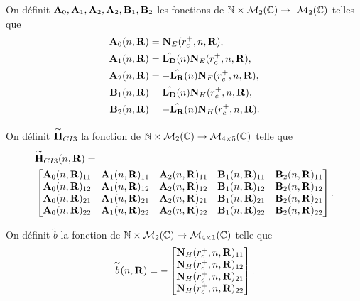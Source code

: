     \begin{defn}
      On définit \(\mathbf{A}_0,\mathbf{A}_1,\mathbf{A}_2,\mathbf{A}_2,\mathbf{B}_1,\mathbf{B}_2\) les fonctions de \(\mathbb N \times \mathcal{M}_2(\mathbb C) \rightarrow \ \mathcal{M}_2(\mathbb C)\) telles que        
      \begin{align*}
        \mathbf{A}_0(n,\mathbf{R}) &= \mathbf{N}_E(r_c^+,n,\mathbf{R}),
        \\
        \mathbf{A}_1(n,\mathbf{R}) &= \hat{\mathbf{L_D}}(n)\mathbf{N}_E(r_c^+,n,\mathbf{R}),
        \\
        \mathbf{A}_2(n,\mathbf{R}) &= -\hat{\mathbf{L_R}}(n)\mathbf{N}_E(r_c^+,n,\mathbf{R}),
        \\
        \mathbf{B}_1(n,\mathbf{R}) &= \hat{\mathbf{L_D}}(n)\mathbf{N}_H(r_c^+,n,\mathbf{R}),
        \\
        \mathbf{B}_2(n,\mathbf{R}) &= -\hat{\mathbf{L_R}}(n)\mathbf{N}_H(r_c^+,n,\mathbf{R}).
      \end{align*}

      On définit \(\overset{\thicksim}{\mathbf{H}}_{CI3}\) la fonction de \(\mathbb N \times \mathcal{M}_2(\mathbb C) \rightarrow \mathcal{M}_{4\times5}(\mathbb C)\) telle que
      \begin{align*}
        & \overset{\thicksim}{\mathbf{H}}_{CI3}(n,\mathbf{R}) =  \\ &
        \begin{bmatrix}
          \mathbf{A}_0(n,\mathbf{R})_{11} & \mathbf{A}_1(n,\mathbf{R})_{11} & \mathbf{A}_2(n,\mathbf{R})_{11} & \mathbf{B}_1(n,\mathbf{R})_{11} & \mathbf{B}_2(n,\mathbf{R})_{11}
          \\
          \mathbf{A}_0(n,\mathbf{R})_{12} & \mathbf{A}_1(n,\mathbf{R})_{12} & \mathbf{A}_2(n,\mathbf{R})_{12} & \mathbf{B}_1(n,\mathbf{R})_{12} & \mathbf{B}_2(n,\mathbf{R})_{12}
          \\
          \mathbf{A}_0(n,\mathbf{R})_{21} & \mathbf{A}_1(n,\mathbf{R})_{21} & \mathbf{A}_2(n,\mathbf{R})_{21} & \mathbf{B}_1(n,\mathbf{R})_{21} & \mathbf{B}_2(n,\mathbf{R})_{21}
          \\
          \mathbf{A}_0(n,\mathbf{R})_{22} & \mathbf{A}_1(n,\mathbf{R})_{22} & \mathbf{A}_2(n,\mathbf{R})_{22} & \mathbf{B}_1(n,\mathbf{R})_{22} & \mathbf{B}_2(n,\mathbf{R})_{22}
        \end{bmatrix}.
      \end{align*}

      On définit \(\tilde{b}\) la fonction de \(\mathbb N \times \mathcal{M}_2(\mathbb C) \rightarrow \mathcal{M}_{4\times1}(\mathbb C)\) telle que
      \begin{equation*}
        \overset{\thicksim}{b}(n,\mathbf{R}) = -
        \begin{bmatrix}
          \mathbf{N}_H(r_c^+,n,\mathbf{R})_{11}
          \\
          \mathbf{N}_H(r_c^+,n,\mathbf{R})_{12}
          \\
          \mathbf{N}_H(r_c^+,n,\mathbf{R})_{21}
          \\
          \mathbf{N}_H(r_c^+,n,\mathbf{R})_{22}
        \end{bmatrix}.
      \end{equation*}
    \end{defn}

